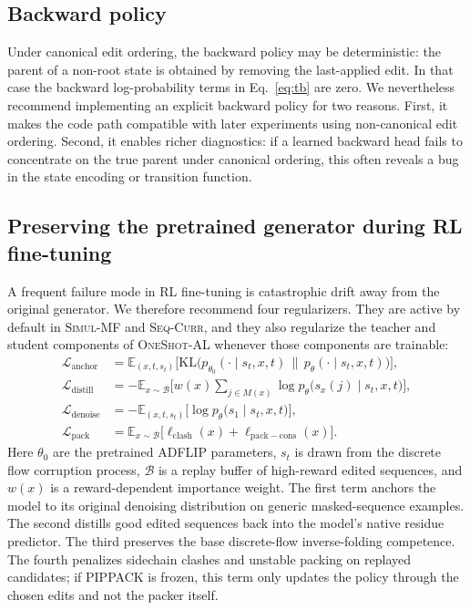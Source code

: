 \documentclass[11pt]{article}
\newcommand{\EE}{\mathbb{E}}
\newcommand{\KL}{\ensuremath{\mathrm{KL}}}
\newcommand{\methodI}{\textsc{Simul-MF}}
\newcommand{\methodII}{\textsc{Seq-Curr}}
\newcommand{\methodIII}{\textsc{OneShot-AL}}
\begin{document}
\subsection{Backward policy}

Under canonical edit ordering, the backward policy may be deterministic: the parent of a non-root state is obtained by removing the last-applied edit. In that case the backward log-probability terms in Eq.~\eqref{eq:tb} are zero. We nevertheless recommend implementing an explicit backward policy for two reasons. First, it makes the code path compatible with later experiments using non-canonical edit ordering. Second, it enables richer diagnostics: if a learned backward head fails to concentrate on the true parent under canonical ordering, this often reveals a bug in the state encoding or transition function.

\subsection{Preserving the pretrained generator during RL fine-tuning}

A frequent failure mode in RL fine-tuning is catastrophic drift away from the original generator. We therefore recommend four regularizers. They are active by default in \methodI{} and \methodII{}, and they also regularize the teacher and student components of \methodIII{} whenever those components are trainable:
\begin{align}
\mathcal{L}_{\mathrm{anchor}} &= \EE_{(x,t,s_t)}\Big[\KL\big(p_{\theta_0}(\cdot\mid s_t,x,t)\,\|\,p_\theta(\cdot\mid s_t,x,t)\big)\Big],\\
\mathcal{L}_{\mathrm{distill}} &= -\EE_{x\sim\mathcal{B}}\Big[w(x)\sum_{j\in M(x)}\log p_\theta\big(s_x(j)\mid s_t,x,t\big)\Big],\\
\mathcal{L}_{\mathrm{denoise}} &= -\EE_{(x,t,s_t)}\Big[\log p_\theta\big(s_1\mid s_t,x,t\big)\Big],\\
\mathcal{L}_{\mathrm{pack}} &= \EE_{x\sim\mathcal{B}}\Big[\ell_{\mathrm{clash}}(x)+\ell_{\mathrm{pack-cons}}(x)\Big].
\end{align}
Here $\theta_0$ are the pretrained ADFLIP parameters, $s_t$ is drawn from the discrete flow corruption process, $\mathcal{B}$ is a replay buffer of high-reward edited sequences, and $w(x)$ is a reward-dependent importance weight. The first term anchors the model to its original denoising distribution on generic masked-sequence examples. The second distills good edited sequences back into the model's native residue predictor. The third preserves the base discrete-flow inverse-folding competence. The fourth penalizes sidechain clashes and unstable packing on replayed candidates; if PIPPACK is frozen, this term only updates the policy through the chosen edits and not the packer itself.
\end{document}
